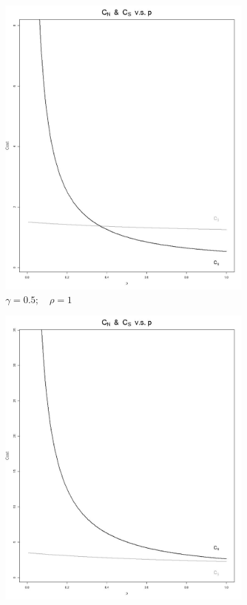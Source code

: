 \documentclass[11pt]{article}
\numberwithin{equation}{section}
\begin{document}
\begin{figure}[h!]
\begin{subfigure}[b]{0.49\textwidth}
	\includegraphics[width=\textwidth]{plots/cost_vs_p_0_5_1.png}
		\caption{$\gamma=0.5;\quad\rho=1$}
		\label{cost_vs_p_0_5_1}
	\end{subfigure}       
	\begin{subfigure}[b]{0.49\textwidth}
	\includegraphics[width=\textwidth]{plots/cost_vs_p_2_5_1.png}

\end{subfigure}
\end{figure}
\end{document}

